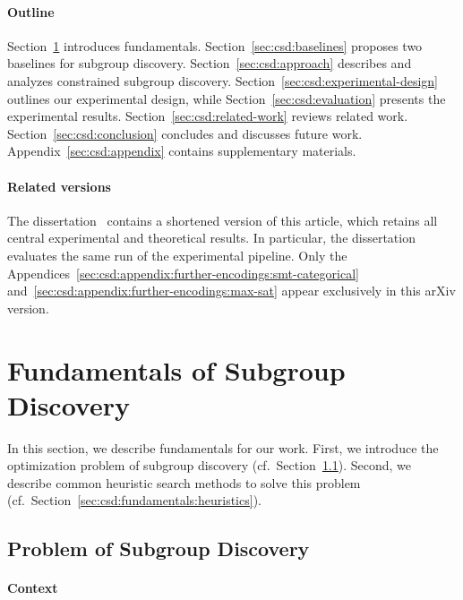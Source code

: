 \documentclass{article}
\theoremstyle{definition}
\begin{document}
\paragraph{Outline}

Section~\ref{sec:csd:fundamentals} introduces fundamentals.
Section~\ref{sec:csd:baselines} proposes two baselines for subgroup discovery.
Section~\ref{sec:csd:approach} describes and analyzes constrained subgroup discovery.
Section~\ref{sec:csd:experimental-design} outlines our experimental design, while Section~\ref{sec:csd:evaluation} presents the experimental results.
Section~\ref{sec:csd:related-work} reviews related work.
Section~\ref{sec:csd:conclusion} concludes and discusses future work.
Appendix~\ref{sec:csd:appendix} contains supplementary materials.

\paragraph{Related versions}

The dissertation~\cite{bach2025leveraging} contains a shortened version of this article, which retains all central experimental and theoretical results.
In particular, the dissertation evaluates the same run of the experimental pipeline.
Only the Appendices~\ref{sec:csd:appendix:further-encodings:smt-categorical} and~\ref{sec:csd:appendix:further-encodings:max-sat} appear exclusively in this arXiv version.

\section{Fundamentals of Subgroup Discovery}
\label{sec:csd:fundamentals}

In this section, we describe fundamentals for our work.
First, we introduce the optimization problem of subgroup discovery (cf.~Section~\ref{sec:csd:fundamentals:problem}).
Second, we describe common heuristic search methods to solve this problem (cf.~Section~\ref{sec:csd:fundamentals:heuristics}).

\subsection{Problem of Subgroup Discovery}
\label{sec:csd:fundamentals:problem}

\paragraph{Context}
\end{document}
